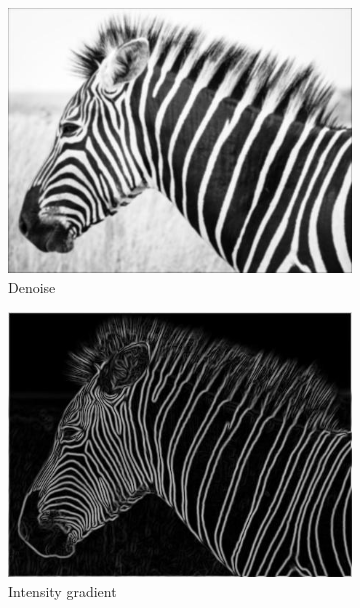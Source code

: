 \documentclass{article}
\begin{document}
	\begin{figure}[htb!]
		\centering
		\begin{subfigure}[t]{0.2\textwidth}
			\centering
			\includegraphics[width=\textwidth]{img/zebra_denoised.jpg}
			\caption{\label{fig:zebra-denoise}Denoise}
		\end{subfigure}
		\hfill
		\begin{subfigure}[t]{0.2\textwidth}
			\centering
			\includegraphics[width=\textwidth]{img/zebra_gradient.jpg}
			\caption{\label{fig:zebra-grad}Intensity gradient}
		\end{subfigure}
		\hfill
		\begin{subfigure}[t]{0.2\textwidth}

\end{subfigure}
\end{figure}
\end{document}
